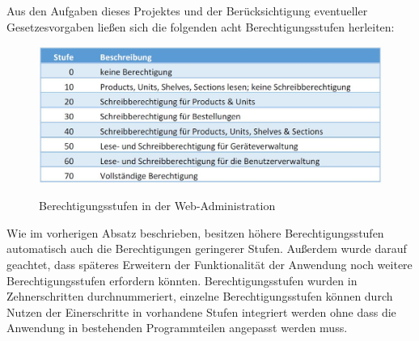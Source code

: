 Aus den Aufgaben dieses Projektes und der Berücksichtigung eventueller Gesetzesvorgaben ließen sich die folgenden acht Berechtigungsstufen herleiten:
\begin{figure}[H]
	\centering
	{\includegraphics[scale=0.5]{Bilder/role_web.jpg}}
	\caption{Berechtigungsstufen in der Web-Administration}
	\label{fig:role_web}
\end{figure}
Wie im vorherigen Absatz beschrieben, besitzen höhere Berechtigungsstufen automatisch auch die Berechtigungen geringerer Stufen. Außerdem wurde darauf geachtet, dass späteres Erweitern der Funktionalität der Anwendung noch weitere Berechtigungsstufen erfordern könnten. Berechtigungsstufen wurden in Zehnerschritten durchnummeriert, einzelne Berechtigungsstufen können durch Nutzen der Einerschritte in vorhandene Stufen integriert werden ohne dass die Anwendung in bestehenden Programmteilen angepasst werden muss.\\

